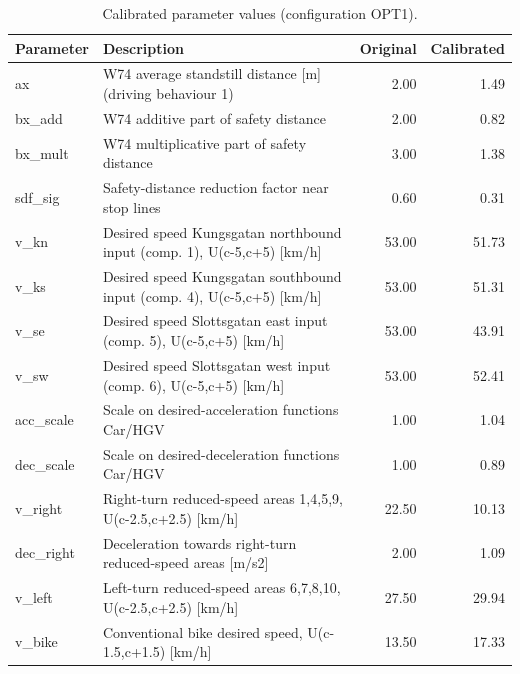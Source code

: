 \begin{table}[H]
\centering
\caption{Calibrated parameter values (configuration OPT1).}
\begin{tabular}{llrr}
\toprule
\textbf{Parameter} & \textbf{Description} & \textbf{Original} & \textbf{Calibrated}\\
\midrule
ax & W74 average standstill distance [m] (driving behaviour 1) & 2.00 & 1.49\\
bx\_add & W74 additive part of safety distance & 2.00 & 0.82\\
bx\_mult & W74 multiplicative part of safety distance & 3.00 & 1.38\\
sdf\_sig & Safety-distance reduction factor near stop lines & 0.60 & 0.31\\
v\_kn & Desired speed Kungsgatan northbound input (comp. 1), U(c-5,c+5) [km/h] & 53.00 & 51.73\\
v\_ks & Desired speed Kungsgatan southbound input (comp. 4), U(c-5,c+5) [km/h] & 53.00 & 51.31\\
v\_se & Desired speed Slottsgatan east input (comp. 5), U(c-5,c+5) [km/h] & 53.00 & 43.91\\
v\_sw & Desired speed Slottsgatan west input (comp. 6), U(c-5,c+5) [km/h] & 53.00 & 52.41\\
acc\_scale & Scale on desired-acceleration functions Car/HGV & 1.00 & 1.04\\
dec\_scale & Scale on desired-deceleration functions Car/HGV & 1.00 & 0.89\\
v\_right & Right-turn reduced-speed areas 1,4,5,9, U(c-2.5,c+2.5) [km/h] & 22.50 & 10.13\\
dec\_right & Deceleration towards right-turn reduced-speed areas [m/s2] & 2.00 & 1.09\\
v\_left & Left-turn reduced-speed areas 6,7,8,10, U(c-2.5,c+2.5) [km/h] & 27.50 & 29.94\\
v\_bike & Conventional bike desired speed, U(c-1.5,c+1.5) [km/h] & 13.50 & 17.33\\
\bottomrule
\end{tabular}
\end{table}

